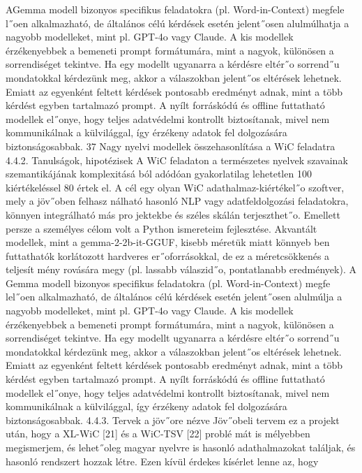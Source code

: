 \documentclass[12pt]{report}
\theoremstyle{definition}
\begin{document}
 AGemma modell bizonyos specifikus feladatokra (pl. Word-in-Context) megfele
l˝oen alkalmazható, de általános célú kérdések esetén jelent˝osen alulmúlhatja a nagyobb
 modelleket, mint pl. GPT-4o vagy Claude.
 A kis modellek érzékenyebbek a bemeneti prompt formátumára, mint a nagyok,
 különösen a sorrendiséget tekintve. Ha egy modellt ugyanarra a kérdésre eltér˝o sorrend˝u
 mondatokkal kérdezünk meg, akkor a válaszokban jelent˝os eltérések lehetnek. Emiatt
 az egyenként feltett kérdések pontosabb eredményt adnak, mint a több kérdést egyben
 tartalmazó prompt.
 A nyílt forráskódú és offline futtatható modellek el˝onye, hogy teljes adatvédelmi
 kontrollt biztosítanak, mivel nem kommunikálnak a külvilággal, így érzékeny adatok fel
dolgozására biztonságosabbak.
 37
Nagy nyelvi modellek összehasonlítása a WiC feladatra
 4.4.2. Tanulságok, hipotézisek
 A WiC feladaton a természetes nyelvek szavainak szemantikájának komplexitásá
ból adódóan gyakorlatilag lehetetlen 100%
 kiértékeléssel 80%
 értek el. A cél egy olyan WiC adathalmaz-kiértékel˝o szoftver, mely a jöv˝oben felhasz
nálható hasonló NLP vagy adatfeldolgozási feladatokra, könnyen integrálható más pro
jektekbe és széles skálán terjeszthet˝o. Emellett persze a személyes célom volt a Python
 ismereteim fejlesztése.
 Akvantált modellek, mint a gemma-2-2b-it-GGUF, kisebb méretük miatt könnyeb
ben futtathatók korlátozott hardveres er˝oforrásokkal, de ez a méretcsökkenés a teljesít
mény rovására megy (pl. lassabb válaszid˝o, pontatlanabb eredmények).
 A Gemma modell bizonyos specifikus feladatokra (pl. Word-in-Context) megfe
lel˝oen alkalmazható, de általános célú kérdések esetén jelent˝osen alulmúlja a nagyobb
 modelleket, mint pl. GPT-4o vagy Claude.
 A kis modellek érzékenyebbek a bemeneti prompt formátumára, mint a nagyok,
 különösen a sorrendiséget tekintve. Ha egy modellt ugyanarra a kérdésre eltér˝o sorrend˝u
 mondatokkal kérdezünk meg, akkor a válaszokban jelent˝os eltérések lehetnek. Emiatt
 az egyenként feltett kérdések pontosabb eredményt adnak, mint a több kérdést egyben
 tartalmazó prompt.
 A nyílt forráskódú és offline futtatható modellek el˝onye, hogy teljes adatvédelmi
 kontrollt biztosítanak, mivel nem kommunikálnak a külvilággal, így érzékeny adatok fel
dolgozására biztonságosabbak.
 4.4.3. Tervek a jöv˝ore nézve
 Jöv˝obeli tervem ez a projekt után, hogy a XL-WiC [21] és a WiC-TSV [22] problé
mát is mélyebben megismerjem, és lehet˝oleg magyar nyelvre is hasonló adathalmazokat
 találjak, és hasonló rendszert hozzak létre. Ezen kívül érdekes kísérlet lenne az, hogy
\end{document}
